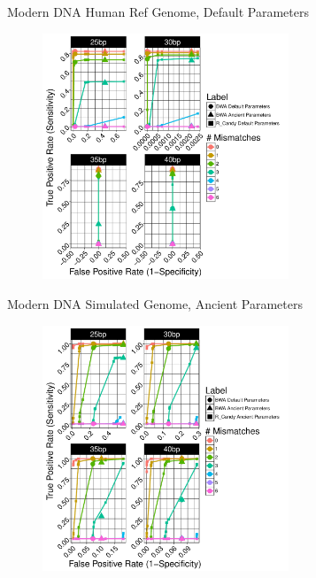 \documentclass{beamer}
\begin{document}
\begin{frame}{\small{Modern DNA Human Ref Genome, Default Parameters}}
	
	\begin{figure}[H]
		\centering
		\includegraphics[width=7.35cm]{pics/f_DS6_emp.pdf}
		
	\end{figure}

\end{frame}

\begin{frame}{\small{Modern DNA Simulated Genome, Ancient Parameters}}
	\begin{figure}[H]
		\centering
		\includegraphics[width=7.35cm]{pics/f_DS8_emp.pdf}
		
	\end{figure}

\end{frame}
\end{document}
